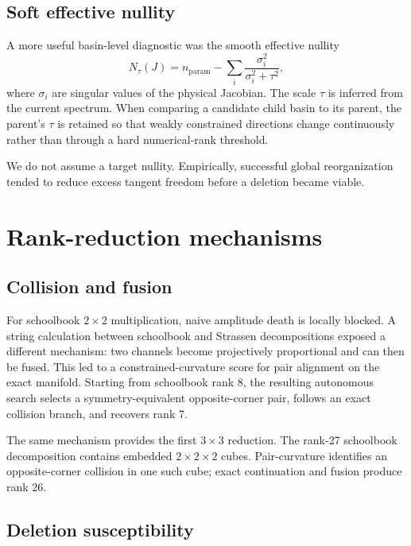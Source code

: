 \documentclass[11pt]{article}
\begin{document}
\subsection{Soft effective nullity}

A more useful basin-level diagnostic was the smooth effective nullity
\begin{equation}
N_\tau(J)
=
 n_{\mathrm{param}}
-
\sum_i \frac{\sigma_i^2}{\sigma_i^2+\tau^2},
\end{equation}
where $\sigma_i$ are singular values of the physical Jacobian.  The scale $\tau$ is inferred from the current spectrum.  When comparing a candidate child basin to its parent, the parent's $\tau$ is retained so that weakly constrained directions change continuously rather than through a hard numerical-rank threshold.

We do not assume a target nullity.  Empirically, successful global reorganization tended to reduce excess tangent freedom before a deletion became viable.

\section{Rank-reduction mechanisms}

\subsection{Collision and fusion}

For schoolbook $2\times2$ multiplication, naive amplitude death is locally blocked.  A string calculation between schoolbook and Strassen decompositions exposed a different mechanism: two channels become projectively proportional and can then be fused.  This led to a constrained-curvature score for pair alignment on the exact manifold.  Starting from schoolbook rank 8, the resulting autonomous search selects a symmetry-equivalent opposite-corner pair, follows an exact collision branch, and recovers rank 7.

The same mechanism provides the first $3\times3$ reduction.  The rank-27 schoolbook decomposition contains embedded $2\times2\times2$ cubes.  Pair-curvature identifies an opposite-corner collision in one such cube; exact continuation and fusion produce rank 26.

\subsection{Deletion susceptibility}
\end{document}

